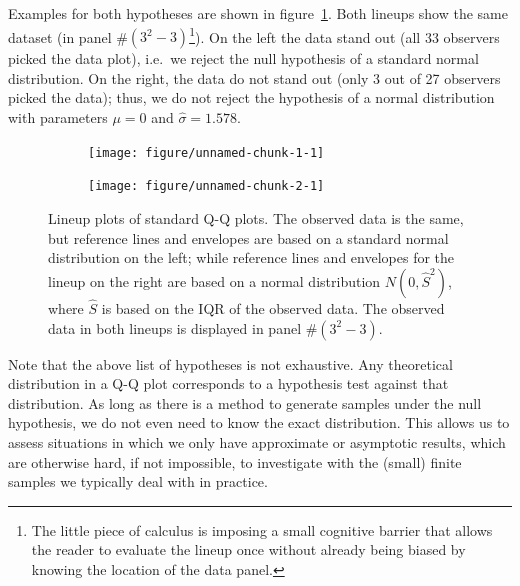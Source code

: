 \documentclass{article}\usepackage[]{graphicx}\usepackage[]{color}
\newenvironment{knitrout}{}{} %
\newcommand{\alnote}[1]{\todo[inline,color=green!40]{#1}}
\begin{document}

Examples for both hypotheses are shown in figure~\ref{fig:lps}. Both lineups show the same dataset (in panel \#$(3^2-3)$\footnote{The little piece of calculus is imposing a small cognitive barrier that allows the reader to evaluate the lineup once without already being biased by knowing the location of the data panel.}). On the left the data stand out (all 33 observers picked the data plot), i.e.~we reject the null hypothesis of a standard normal distribution. On the right, the data do not stand out (only 3 out of 27 observers picked the data); thus, we do not reject the hypothesis of a normal distribution with parameters $\mu=0$ and $\widehat{\sigma}=1.578$. 

\begin{figure}[hbt]

\begin{subfigure}{0.5\textwidth}
\begin{knitrout}
\color{fgcolor}
\texttt{[image: figure/unnamed-chunk-1-1]} 

\end{knitrout}
\end{subfigure}
\begin{subfigure}{0.5\textwidth}
\begin{knitrout}
\color{fgcolor}
\texttt{[image: figure/unnamed-chunk-2-1]} 

\end{knitrout}
\end{subfigure}
\caption{\label{fig:lps} Lineup plots of standard Q-Q plots. The observed data is the same, but  reference lines and envelopes are based on a standard normal distribution on the left; while  reference lines and envelopes for the lineup on the right are based on a normal distribution $N(0, \widehat{S}^2)$, where $\widehat{S}$ is based on the IQR of the observed data.
The observed data in both lineups is displayed in panel \#$(3^2 - 3)$. }
\end{figure}
\afterpage{\clearpage}

Note that the above list of hypotheses is not exhaustive. Any theoretical distribution in a Q-Q plot corresponds to a  hypothesis test against that distribution. As long as there is a method to generate samples under the null hypothesis, we do not even need to know the exact distribution. This allows us to assess situations in which we only have approximate or asymptotic results, which are otherwise hard, if not impossible, to investigate  with the (small) finite samples we typically deal with in practice.
\end{document}
